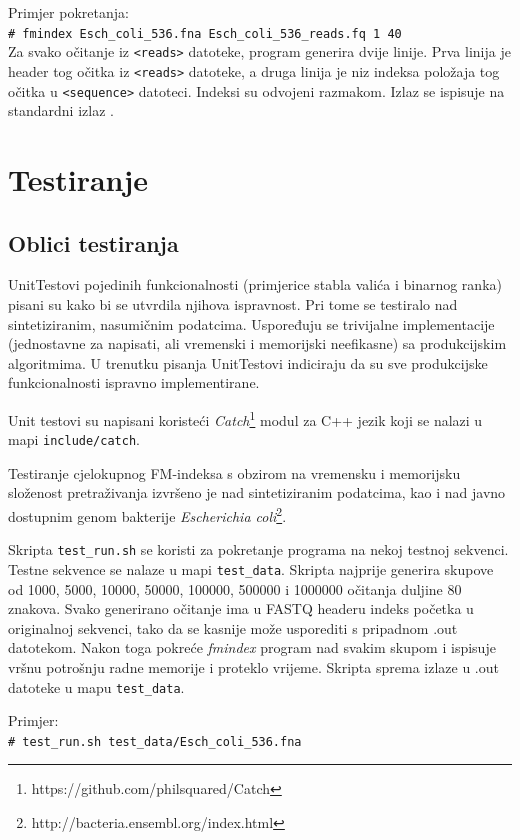 \documentclass[times, utf8, seminar, numeric]{fer}
\newcommand{\shellcmd}[1]{\\\indent\indent\texttt{\footnotesize\# #1}\\}
\begin{document}
\noindent Primjer pokretanja:
\shellcmd{fmindex Esch\_coli\_536.fna Esch\_coli\_536\_reads.fq 1 40}

Za svako očitanje iz \texttt{<reads>} datoteke, program generira dvije linije. Prva linija je header tog očitka iz \texttt{<reads>} datoteke, a druga linija je niz indeksa položaja tog očitka u \texttt{<sequence>} datoteci. Indeksi su odvojeni razmakom. Izlaz se ispisuje na standardni izlaz .

\section{Testiranje}

\subsection{Oblici testiranja}

UnitTestovi pojedinih funkcionalnosti (primjerice stabla valića i binarnog ranka) pisani su
kako bi se utvrdila njihova ispravnost. Pri tome se testiralo nad sintetiziranim,
nasumičnim podatcima. Uspoređuju se trivijalne implementacije (jednostavne za napisati,
ali vremenski i memorijski neefikasne) sa produkcijskim algoritmima. U trenutku pisanja
UnitTestovi indiciraju da su sve produkcijske funkcionalnosti ispravno implementirane.

Unit testovi su napisani koristeći \textit{Catch}\footnote{https://github.com/philsquared/Catch} modul za C++ jezik koji se nalazi u mapi \texttt{include/catch}. 

Testiranje cjelokupnog FM-indeksa s obzirom na vremensku i memorijsku složenost
pretraživanja izvršeno je nad sintetiziranim podatcima, kao i nad 
javno dostupnim genom bakterije \textit{Escherichia coli}\footnote{http://bacteria.ensembl.org/index.html}.

Skripta \texttt{test\_run.sh} se koristi za pokretanje programa na nekoj testnoj sekvenci. Testne sekvence se nalaze u mapi \texttt{test\_data}. Skripta najprije generira skupove od 1000, 5000, 10000, 50000, 100000, 500000 i 1000000 očitanja  duljine 80 znakova.
Svako generirano očitanje ima u FASTQ headeru indeks početka u originalnoj sekvenci, tako da se kasnije može usporediti s pripadnom .out datotekom.
Nakon toga pokreće \textit{fmindex} program nad svakim skupom i ispisuje vršnu potrošnju radne memorije i proteklo vrijeme. Skripta sprema izlaze u .out datoteke u mapu \texttt{test\_data}.

\noindent Primjer:
\shellcmd{test\_run.sh test\_data/Esch\_coli\_536.fna}
\end{document}
